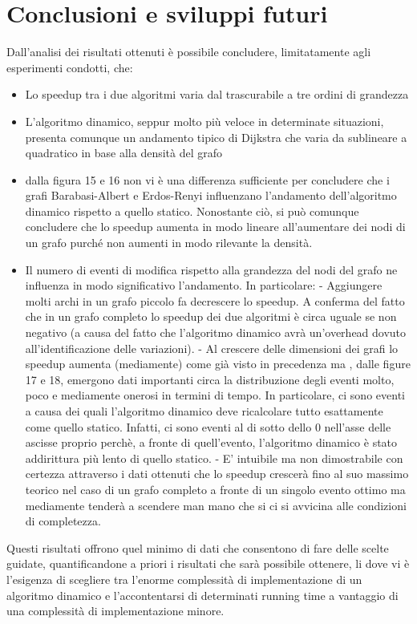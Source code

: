 \documentclass[a4paper]{article}
\begin{document}
\section{Conclusioni e sviluppi futuri}
Dall'analisi dei risultati ottenuti è possibile concludere, limitatamente agli
esperimenti condotti, che:
\begin{itemize}
\item Lo speedup tra i due algoritmi varia dal trascurabile a tre ordini di grandezza
\item L'algoritmo dinamico, seppur molto più veloce in determinate situazioni, presenta comunque un andamento tipico di Dijkstra che varia da sublineare a quadratico in base alla densità del grafo
\item dalla figura 15 e 16 non vi è una differenza sufficiente per concludere che i grafi Barabasi-Albert e Erdos-Renyi influenzano l'andamento dell'algoritmo dinamico rispetto a quello statico. Nonostante ciò, si può comunque concludere che lo speedup aumenta in modo lineare all'aumentare dei nodi di un grafo purché non aumenti in modo rilevante la densità.
\item Il numero di eventi di modifica rispetto alla grandezza del nodi del grafo ne influenza in modo significativo l'andamento. In particolare:
- Aggiungere molti archi in un grafo piccolo fa decrescere lo speedup. A conferma del fatto che in un grafo completo lo speedup dei due algoritmi è circa uguale se non negativo (a causa del fatto che l'algoritmo dinamico avrà un'overhead dovuto all'identificazione delle variazioni).
- Al crescere delle dimensioni dei grafi lo speedup aumenta (mediamente) come già visto in precedenza ma , dalle figure 17 e 18, emergono dati importanti circa la distribuzione degli eventi molto, poco e mediamente onerosi in termini di tempo. In particolare, ci sono eventi a causa dei quali l'algoritmo dinamico deve ricalcolare tutto esattamente come quello statico. Infatti, ci sono eventi al di sotto dello 0 nell'asse delle ascisse proprio perchè, a fronte di quell'evento, l'algoritmo dinamico è stato addirittura più lento di quello statico.
- E' intuibile ma non dimostrabile con certezza attraverso i dati ottenuti che lo speedup crescerà fino al suo massimo teorico nel caso di un grafo completo a fronte di un singolo evento ottimo ma mediamente tenderà a scendere man mano che si ci si avvicina alle condizioni di completezza.
\end{itemize}
Questi risultati offrono quel minimo di dati che consentono di fare delle scelte guidate, quantificandone a priori i risultati che sarà possibile ottenere, li dove vi è l'esigenza di scegliere tra l'enorme complessità di implementazione di un algoritmo dinamico e l'accontentarsi di determinati running time a vantaggio di una complessità di implementazione minore.
\end{document}
